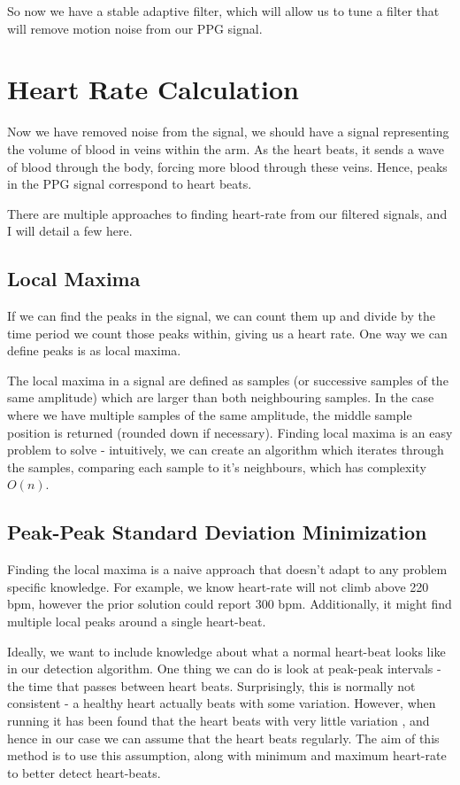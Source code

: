 \documentclass[12pt,a4paper,twoside,openright]{report}
\begin{document}
So now we have a stable adaptive filter, which will allow us to tune a filter
that will remove motion noise from our PPG signal.

\section{Heart Rate Calculation}

Now we have removed noise from the signal, we should have a signal 
representing the volume of blood in veins within the arm. As the heart beats,
it sends a wave of blood through the body, forcing more blood through these
veins. Hence, peaks in the PPG signal correspond to heart beats. 

There are multiple approaches to finding heart-rate from our filtered
signals, and I will detail a few here.

\subsection{Local Maxima}

If we can find the peaks in the signal, we can count them up and divide by the
time period we count those peaks within, giving us a heart rate. One way we
can define peaks is as local maxima.

The local maxima in a signal are defined as samples (or successive samples of
the same amplitude) which are larger than both
neighbouring samples. In the case where we have multiple samples of the same
amplitude, the middle
sample position is returned (rounded down if necessary).
Finding local maxima is an easy problem to solve - 
intuitively, we can create an algorithm which iterates through the samples,
comparing each sample to it's neighbours, which has complexity \(O(n)\).

\subsection{Peak-Peak Standard Deviation Minimization}
\label{sec:sd-min}

Finding the local maxima is a naive approach that doesn't adapt to any problem
specific knowledge. For example, we know heart-rate will not climb above 220
bpm, however the prior solution could report 300 bpm. Additionally, it might
find multiple local peaks around a single heart-beat. 

Ideally, we want to include knowledge about what a normal heart-beat looks
like in our detection algorithm. One thing we can do is look at peak-peak
intervals - the time that passes between heart beats. Surprisingly, this is
normally not consistent - a healthy heart actually beats with some
variation. However, when running it has been found that the heart beats with
very little variation \cite{michael17}, and hence in our case we can assume that the heart
beats regularly. The aim of this method is to use this assumption, along with
minimum and maximum heart-rate to better detect heart-beats.
\end{document}
